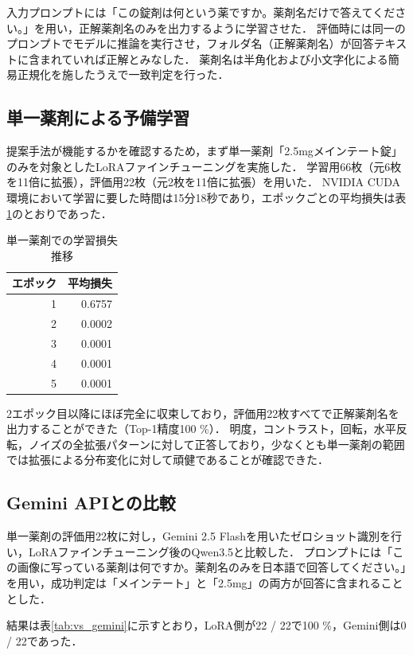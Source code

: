 \documentclass{ltjsarticle}
\begin{document}
入力プロンプトには「この錠剤は何という薬ですか。薬剤名だけで答えてください。」を用い，正解薬剤名のみを出力するように学習させた．
評価時には同一のプロンプトでモデルに推論を実行させ，フォルダ名（正解薬剤名）が回答テキストに含まれていれば正解とみなした．
薬剤名は半角化および小文字化による簡易正規化を施したうえで一致判定を行った．

\subsection{単一薬剤による予備学習}

提案手法が機能するかを確認するため，まず単一薬剤「2.5mgメインテート錠」のみを対象としたLoRAファインチューニングを実施した．
学習用66枚（元6枚を11倍に拡張），評価用22枚（元2枚を11倍に拡張）を用いた．
NVIDIA CUDA環境において学習に要した時間は15分18秒であり，エポックごとの平均損失は表\ref{tab:loss_meinte}のとおりであった．

\begin{table}[h]
\centering
\caption{単一薬剤での学習損失推移}
\label{tab:loss_meinte}
\begin{tabular}{rr}
\hline
エポック & 平均損失 \\
\hline
1 & 0.6757 \\
2 & 0.0002 \\
3 & 0.0001 \\
4 & 0.0001 \\
5 & 0.0001 \\
\hline
\end{tabular}
\end{table}

2エポック目以降にほぼ完全に収束しており，評価用22枚すべてで正解薬剤名を出力することができた（Top-1精度100 \%）．
明度，コントラスト，回転，水平反転，ノイズの全拡張パターンに対して正答しており，少なくとも単一薬剤の範囲では拡張による分布変化に対して頑健であることが確認できた．

\subsection{Gemini APIとの比較}

単一薬剤の評価用22枚に対し，Gemini 2.5 Flashを用いたゼロショット識別を行い，LoRAファインチューニング後のQwen3.5と比較した．
プロンプトには「この画像に写っている薬剤は何ですか。薬剤名のみを日本語で回答してください。」を用い，成功判定は「メインテート」と「2.5mg」の両方が回答に含まれることとした．

結果は表\ref{tab:vs_gemini}に示すとおり，LoRA側が22 / 22で100 \%，Gemini側は0 / 22であった．
\end{document}
